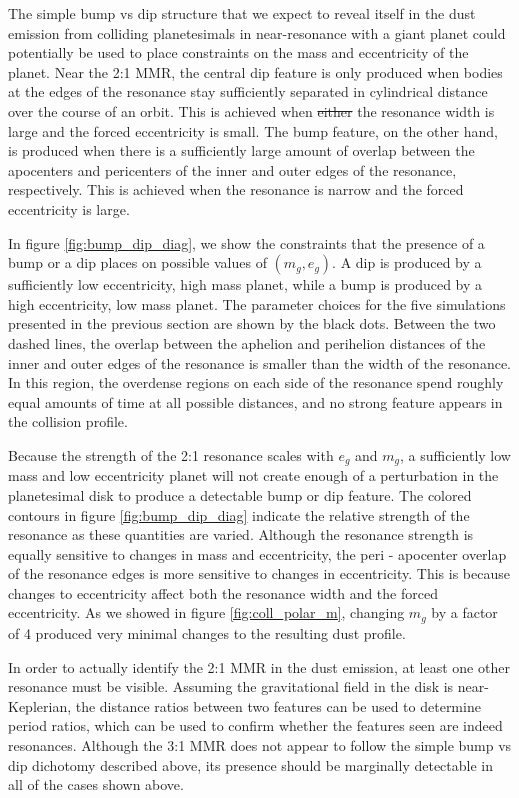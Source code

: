 \documentclass[twocolumn]{aastex63}
\begin{document}
The simple bump vs dip structure that we expect to reveal itself in the dust emission from colliding planetesimals in near-resonance with a giant 
planet could potentially be used to place constraints on the mass and eccentricity of the planet. Near the 2:1 MMR, the central dip feature is only 
produced when bodies at the edges of the resonance stay sufficiently separated in cylindrical distance over the course of an orbit. This is achieved 
when \sout{either} the resonance width is large and the forced eccentricity is small. The bump feature, on the other hand, is produced when there is a 
sufficiently large amount of overlap between the apocenters and pericenters of the inner and outer edges of the resonance, respectively. This is 
achieved when the resonance is narrow and the forced eccentricity is large.

In figure \ref{fig:bump_dip_diag}, we show the constraints that the presence of a bump or a dip places on possible values of $(m_{g}, e_{g})$. A dip 
is produced by a sufficiently low eccentricity, high mass planet, while a bump is produced by a high eccentricity, low mass planet. The parameter 
choices for the five simulations presented in the previous section are shown by the black dots. Between the two dashed lines, the overlap between 
the aphelion and perihelion distances of the inner and outer edges of the resonance is smaller than the width of the resonance. In this region, the 
overdense regions on each side of the resonance spend roughly equal amounts of time at all possible distances, and no strong feature appears in 
the collision profile.

Because the strength of the 2:1 resonance scales with $e_{g}$ and  $m_{g}$, a sufficiently low mass and low eccentricity planet will not create 
enough of a perturbation in the planetesimal disk to produce a detectable bump or dip feature. The colored contours in figure \ref{fig:bump_dip_diag} 
indicate the relative strength of the resonance as these quantities are varied. Although the resonance strength is equally sensitive to changes in 
mass and eccentricity, the peri - apocenter overlap of the resonance edges is more sensitive to changes in eccentricity. This is because changes to 
eccentricity affect both the resonance width and the forced eccentricity. As we showed in figure \ref{fig:coll_polar_m}, changing $m_{g}$ by a factor 
of 4 produced very minimal changes to the resulting dust profile.

In order to actually identify the 2:1 MMR in the dust emission, at least one other resonance must be visible. Assuming the gravitational field in the 
disk is near-Keplerian, the distance ratios between two features can be used to determine period ratios, which can be used to confirm whether the 
features seen are indeed resonances. Although the 3:1 MMR does not appear to follow the simple bump vs dip dichotomy described above, its 
presence should be marginally detectable in all of the cases shown above.
\end{document}
